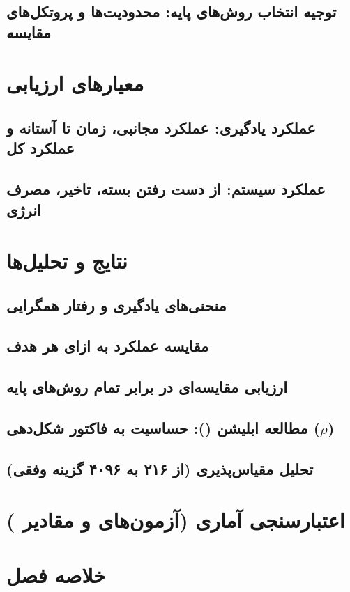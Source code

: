 \documentclass[oneside,openany,phd]{TMU-Thesis}
\begin{document}
\subsection{توجیه انتخاب روش‌های پایه: محدودیت‌ها و پروتکل‌های مقایسه}

\section{معیارهای ارزیابی}
\subsection{عملکرد یادگیری: عملکرد مجانبی، زمان تا آستانه و عملکرد کل}
\subsection{عملکرد سیستم: از دست رفتن بسته، تاخیر، مصرف انرژی}

\section{نتایج و تحلیل‌ها}
\subsection{منحنی‌های یادگیری و رفتار همگرایی}
\subsection{مقایسه عملکرد به ازای هر هدف}
\subsection{ارزیابی مقایسه‌ای در برابر تمام روش‌های پایه}
\subsection{مطالعه ابلیشن (): حساسیت به فاکتور شکل‌دهی (\texorpdfstring{$\rho$}{rho})}
\subsection{تحلیل مقیاس‌پذیری (از ۲۱۶ به ۴۰۹۶ گزینه وفقی)}

\section{اعتبارسنجی آماری (آزمون‌های  و مقادیر )}

\section{خلاصه فصل}
\end{document}
